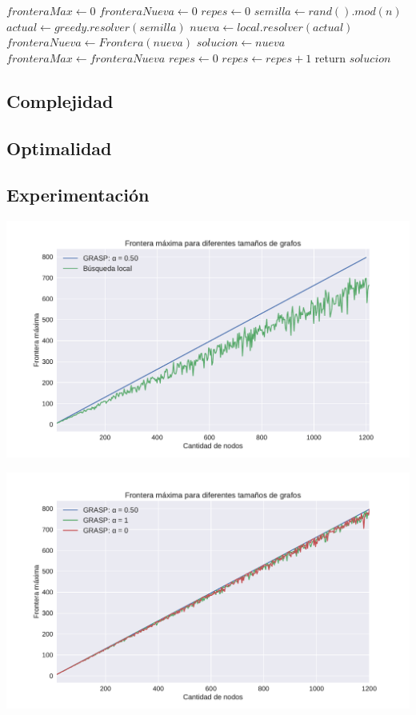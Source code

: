 \begin{algorithm}[H]
\begin{algorithmic}
	\State $fronteraMax \gets 0$
	\State $fronteraNueva \gets 0$
	\State $repes \gets 0$
        \State $semilla \gets rand().mod(n)$
        \State $actual \gets greedy.resolver(semilla)$
    	\State $nueva \gets local.resolver(actual)$
    	\State $fronteraNueva \gets Frontera(nueva)$
    		\State $solucion \gets nueva$
    		\State $fronteraMax \gets fronteraNueva$
            \State $repes \gets 0$
    	\Else
    		\State $repes \gets repes + 1$
    	\EndIf
    \EndWhile
    \State return $solucion$

\EndFunction
\end{algorithmic}
\end{algorithm}


\subsection{Complejidad}


\subsection{Optimalidad}


\subsection{Experimentación}

{\centering
    \includegraphics[width=1\textwidth]{informe/imgs/exp_malo_frontera_grasp_local.pdf}
}

{\centering
    \includegraphics[width=1\textwidth]{informe/imgs/exp_malo_frontera_grasp.pdf}
}

